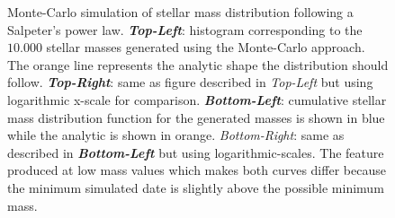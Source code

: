 \begin{figure}[!ht]
\centering
\caption{\scriptsize{Monte-Carlo simulation of stellar mass distribution following a Salpeter's power law. \textit{\textbf{Top-Left}}: histogram corresponding to the $10.000$ stellar masses generated using the Monte-Carlo approach. The orange line represents the analytic shape the distribution should follow. \textit{\textbf{Top-Right}}: same as figure described in \textit{Top-Left} but using logarithmic x-scale for comparison. \textit{\textbf{Bottom-Left}}: cumulative stellar mass distribution function for the generated masses is shown in blue while the analytic is shown in orange. \textit{Bottom-Right}: same as described in \textit{\textbf{Bottom-Left}} but using logarithmic-scales. The feature produced at low mass values which makes both curves differ because the minimum simulated date is slightly above the possible minimum mass.%
}}
\label{fig:Salpeter_IMF}
\end{figure}

